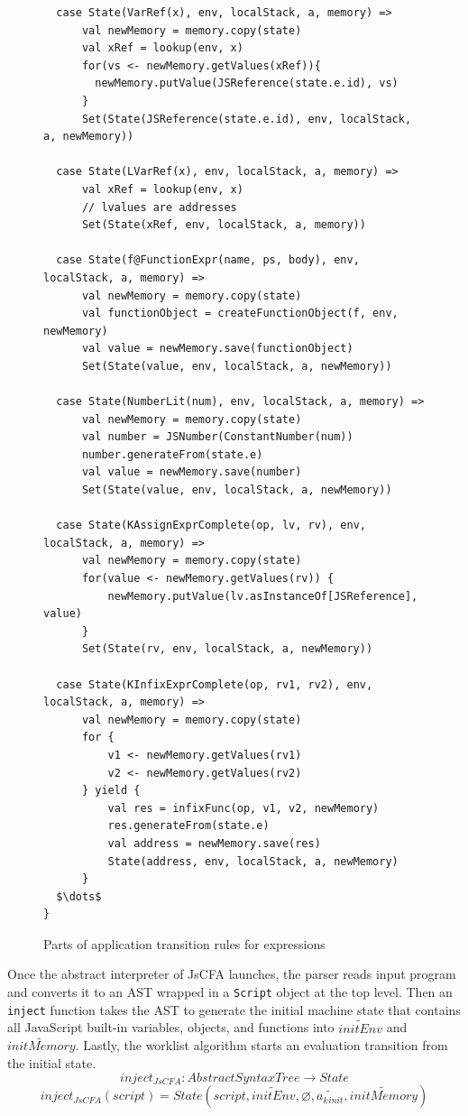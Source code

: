 \documentclass[12pt]{report}
\begin{document}
\begin{figure}
\lstset{language=Scala, mathescape,
basicstyle=\scriptsize\ttfamily}
\begin{lstlisting}
  case State(VarRef(x), env, localStack, a, memory) =>
      val newMemory = memory.copy(state)
      val xRef = lookup(env, x)
      for(vs <- newMemory.getValues(xRef)){
        newMemory.putValue(JSReference(state.e.id), vs)
      }
      Set(State(JSReference(state.e.id), env, localStack, a, newMemory))

  case State(LVarRef(x), env, localStack, a, memory) =>
      val xRef = lookup(env, x)
      // lvalues are addresses
      Set(State(xRef, env, localStack, a, memory))

  case State(f@FunctionExpr(name, ps, body), env, localStack, a, memory) =>
      val newMemory = memory.copy(state)
      val functionObject = createFunctionObject(f, env, newMemory)
      val value = newMemory.save(functionObject)
      Set(State(value, env, localStack, a, newMemory))

  case State(NumberLit(num), env, localStack, a, memory) =>
      val newMemory = memory.copy(state)
      val number = JSNumber(ConstantNumber(num))
      number.generateFrom(state.e)
      val value = newMemory.save(number)
      Set(State(value, env, localStack, a, newMemory))

  case State(KAssignExprComplete(op, lv, rv), env, localStack, a, memory) =>
      val newMemory = memory.copy(state)
      for(value <- newMemory.getValues(rv)) {
          newMemory.putValue(lv.asInstanceOf[JSReference], value)
      }
      Set(State(rv, env, localStack, a, newMemory))

  case State(KInfixExprComplete(op, rv1, rv2), env, localStack, a, memory) =>
      val newMemory = memory.copy(state)
      for {
          v1 <- newMemory.getValues(rv1)
          v2 <- newMemory.getValues(rv2)
      } yield {
          val res = infixFunc(op, v1, v2, newMemory)
          res.generateFrom(state.e)
          val address = newMemory.save(res)
          State(address, env, localStack, a, newMemory)
      }
  $\dots$
}
\end{lstlisting}
\caption{Parts of application transition rules for expressions}
\label{fig:app-expr}
\end{figure}

Once the abstract interpreter of JsCFA launches, the parser reads input program and converts it to an AST wrapped in a \verb|Script| object at the top level.
Then an \verb|inject| function takes the AST to generate the initial machine state that contains all JavaScript built-in variables, objects, and functions into $\widetilde{initEnv}$ and $\widetilde{initMemory}$. Lastly, the worklist algorithm starts an evaluation transition from the initial state.
\[
inject_{JsCFA} : AbstractSyntaxTree \to State
\]
\[
inject_{JsCFA}(script) = State(script, \widetilde{initEnv}, \varnothing, \widetilde{a_k{}_{init}}, \widetilde{initMemory})
\]
\end{document}
